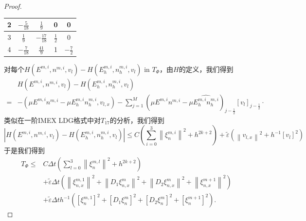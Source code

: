 \begin{proof}
\begin{center}
\begin{tabular}{|c|c|c|c|c|}
            \hline
            2     & $-\frac{5}{18}$                      & $\frac{1}{9}$    & 0             & 0              \\
            \hline
            3     & $\frac{1}{9}$                        & $-\frac{17}{18}$ & $\frac{1}{2}$ & 0              \\
            \hline
            4     & $-\frac{7}{18}$                      & $\frac{41}{9}$   & 1             & $-\frac{7}{2}$ \\
            \hline
        \end{tabular}
    \end{center}
    对每个$H\left(E^{m, i}, n^{m, i}, v_{l}\right)-H\left(E_{h}^{m, i}, n_{h}^{m, i}, v_{l}\right)$ in $T_{\Phi}$，由$H$的定义，我们得到
    \begin{align*}
          & H\left(E^{m, i}, n^{m, i}, v_{l}\right)-H\left(E_{h}^{m, i}, n_{h}^{m, i}, v_{l}\right)                                                                                                                                      \\
        = & -\left(\mu E^{m, i} n^{m, i}-\mu E_{h}^{m, i} n_{h}^{m, i}, v_{l, x}\right)-\sum_{j=1}^{M}\left(\mu E^{m, i} n^{m, i}-\mu \widehat{E_{h}^{m, i} n_{h}^{m, i}}\right)_{j-\frac{1}{2}}\left[v_{l}\right]_{j-\frac{1}{2}} \cdot
    \end{align*}
    类似在一阶IMEX LDG格式中对$T_{17}$的分析，我们得到
    \begin{equation}
        \left|H\left(E^{m, i}, n^{m, i}, v_{l}\right)-H\left(E_{h}^{m, i}, n_{h}^{m, i}, v_{l}\right)\right| \leq C\left(\sum_{i=0}^{3}\left\|\xi_{n}^{m, i}\right\|^{2}+h^{2 k+2}\right)+\tilde{\varepsilon}\left(\left\|v_{l, x}\right\|^{2}+h^{-1}\left[v_{l}\right]^{2}\right)
    \end{equation}
    于是我们得到
    $$
        \begin{aligned}
            T_{\Phi} \leq & C \Delta t\left(\sum_{l=0}^{3}\left\|\xi_{n}^{m, l}\right\|^{2}+h^{2 k+2}\right)                                                                                                                   \\
                          & +\tilde{\varepsilon} \Delta t\left(\left\|\xi_{n, x}^{m, 1}\right\|^{2}+\left\|D_{1} \xi_{n, x}^{m}\right\|^{2}+\left\|D_{2} \xi_{n, x}^{m}\right\|^{2}+\left\|\xi_{n, x}^{m+1}\right\|^{2}\right) \\
                          & +\tilde{\varepsilon} \Delta t h^{-1}\left(\left[\xi_{n}^{m, 1}\right]^{2}+\left[D_{1} \xi_{n}^{m}\right]^{2}+\left[D_{2} \xi_{n}^{m}\right]^{2}+\left[\xi_{n}^{m+1}\right]^{2}\right) .
        \end{aligned}
    $$


\end{proof}
